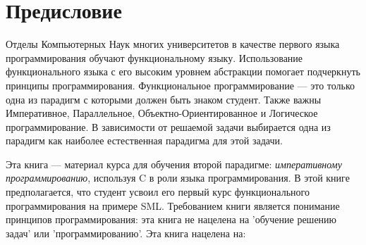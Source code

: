 \chapter*{Предисловие}

Отделы Компьютерных Наук многих университетов в качестве первого языка программирования обучают функциональному языку. Использование функционального языка с его высоким уровнем абстракции помогает подчеркнуть принципы программирования. Функциональное программирование --- это только одна из парадигм с которыми должен быть знаком студент. Также важны Императивное, Параллельное, Объектно-Ориентированное и Логическое программирование. В зависимости от решаемой задачи выбирается одна из парадигм как наиболее естественная парадигма для этой задачи.

Эта книга --- материал курса для обучения второй парадигме: \emph{императивному программированию}, используя C в роли языка программирования. В этой книге предполагается, что студент усвоил его первый курс функционального программирования на примере SML. Требованием книги является понимание принципов программирования: эта книга не нацелена на 'обучение решению задач' или 'программированию'. Эта книга нацелена на:

